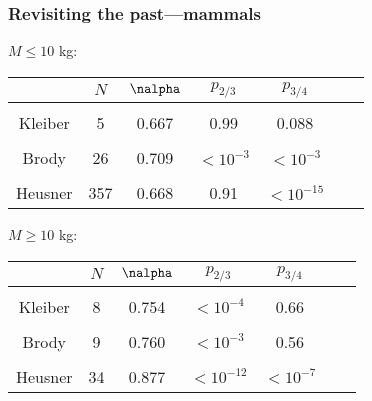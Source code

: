 \begin{frame}
  \frametitle{Revisiting the past---mammals}

  \small
  \begin{block}{$M \leq 10$ kg:}
    \settablerowcolours
  \begin{tabular}{ccccccc}
    & $N$ & $\nalpha$ & $p_{2/3}$ & $p_{3/4}$ \\ \hline
    & & & & & & \\
    Kleiber        &   5 & 0.667 &  0.99 & 0.088 \\
    & & & & & & \\
    Brody          &  26 & 0.709   & $<10^{-3}$ & $<10^{-3}$ \\
    & & & & & & \\
    Heusner        & 357 & 0.668 &   0.91 &   $<10^{-15}$ \\
  \end{tabular}
  \end{block}

  \begin{block}{$M \geq 10$ kg:}
      \settablerowcolours
  \begin{tabular}{ccccccc}
    & $N$ & $\nalpha$ &  $p_{2/3}$ & $p_{3/4}$ \\ \hline
    & & & & & & \\
    Kleiber        &   8 & 0.754 & $<10^{-4}$ & 0.66 \\
    & & & & & & \\
    Brody          &   9 & 0.760 & $<10^{-3}$ & 0.56 \\
    & & & & & & \\
    Heusner        &  34 & 0.877 & $< 10^{-12}$ & $<10^{-7}$ \\
  \end{tabular}
  \end{block}





\end{frame}

